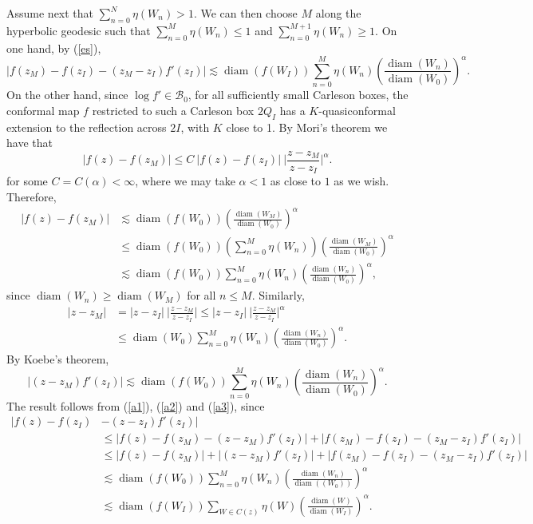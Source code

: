 \documentclass[12pt,a4paper]{article}
\theoremstyle{definition}
\theoremstyle{remark}
\newcommand{\diam}{\operatorname{diam}}
\numberwithin{komcounter}{section}
\begin{document}
Assume next that $\sum_{n=0}^{N}\eta(W_n)> 1$. We can then choose $M$ along the hyperbolic geodesic such that  $\sum_{n=0}^{M} \eta(W_n)\leq 1$ and   $\sum_{n=0}^{M+1} \eta(W_n)\geq 1$. On one hand, by (\ref{es}),
\begin{equation}\label{a1}
|f(z_M)-f(z_I)-(z_M-z_I) f'(z_I)|\lesssim \diam (f(W_I )) \sum_{n=0}^{M}
\eta(W_n) \left(\frac{\diam (W_n)} {\diam (W_0)}\right)^\alpha.
\end{equation}
On the other hand, since $\log f'\in \mathcal{B}_0$, for all
sufficiently small Carleson boxes, the conformal map
$f$ restricted to such a Carleson box $2Q_I$ has a $K$-quasiconformal extension to the
reflection across $2I$, with $K$ close to 1. By Mori's theorem we have that 
$$
|f(z)-f(z_M)|\leq C~|f(z)-f(z_I)|~\bigg|\frac{z-z_M}{z-z_I}\bigg|^\alpha.
$$
for some $C = C(\alpha) < \infty$, where we may take $\alpha < 1$ as close to $1$ as we wish.\\
Therefore,
\begin{align}\nonumber
|f(z)-f(z_M)|&\lesssim \diam (f(W_0))\left(\frac{\diam(W_M)}{\diam (W_0)}\right)^\alpha\\\nonumber
&\leq \diam (f(W_0))\left( \sum_{n=0}^{M} \eta(W_n)\right) \left(\frac{\diam(W_M)}{\diam (W_0)}\right)^\alpha\\& \lesssim \diam (f(W_0)) \sum_{n=0}^{M} \eta(W_n) \left(\frac{\diam(W_n)}{\diam (W_0)}\right)^\alpha,\label{a2}
\end{align}
since $\diam (W_n)\geq \diam(W_M)$ for all $n\leq M$. Similarly,
\begin{align}\nonumber
|z-z_M|&=|z-z_I|~\bigg|\frac{z-z_M}{z-z_I}\bigg|\leq |z-z_I|~\bigg|\frac{z-z_M}{z-z_I}\bigg|^\alpha \\
&\leq \diam (W_0) \sum_{n=0}^{M} \eta(W_n) \left(\frac{\diam(W_n)}{\diam (W_0)}\right)^\alpha.\nonumber
\end{align}
By Koebe's theorem,
\begin{equation}\label{a3}
|(z-z_M) f'(z_I)|\lesssim \diam \left(f (W_0)\right) \sum_{n=0}^{M} \eta(W_n) \left(\frac{\diam(W_n)}{\diam (W_0)}\right)^\alpha.
\end{equation}
The result follows from (\ref{a1}), (\ref{a2}) and (\ref{a3}), since
\begin{align}\nonumber
|f(z)-f(z_I)&-(z-z_I) f'(z_I)|\\\nonumber
&\leq 
|f(z)-f(z_M)-(z-z_M) f'(z_I)|+ |f(z_M)-f(z_I)-(z_M-z_I) f'(z_I)|\\\nonumber
&	\leq 	|f(z)-f(z_M)|+|(z-z_M) f'(z_I)|+ |f(z_M)-f(z_I)-(z_M-z_I) f'(z_I)|\\
&\lesssim  \diam (f (W_0)) \sum_{n=0}^{M} \eta(W_n) \left(\frac{\diam(W_n)}{\diam ((W_0))}\right)^\alpha\nonumber\\&\lesssim  \diam (f(W_I )) \sum_{W\in C(z)}
\eta(W) \left(\frac{\diam (W)} {\diam (W_I)}\right)^\alpha.\nonumber
\end{align}
\end{document}
